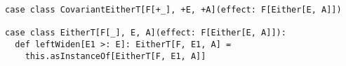 \begin{algorithm}

\begin{verbatim}
case class CovariantEitherT[F[+_], +E, +A](effect: F[Either[E, A]])

case class EitherT[F[_], E, A](effect: F[Either[E, A]]):
  def leftWiden[E1 >: E]: EitherT[F, E1, A] =
    this.asInstanceOf[EitherT[F, E1, A]]
\end{verbatim}

\caption{EitherT leftWiden method %
\label{monadtransformer:either-t-variance}}
\end{algorithm}